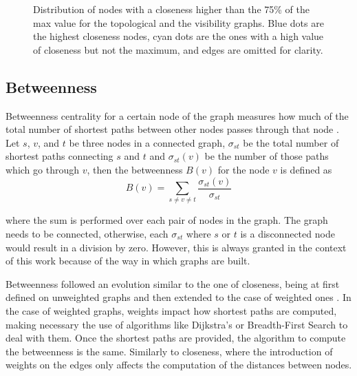 \begin{figure}


\caption{Distribution of nodes with a closeness higher than the 75\% of the
max value for the topological and the visibility graphs. Blue dots
are the highest closeness nodes, cyan dots are the ones with a high
value of closeness but not the maximum, and edges are omitted for
clarity.}

\end{figure}


\subsection{Betweenness}

Betweenness centrality for a certain node of the graph measures how
much of the total number of shortest paths between other nodes passes
through that node \cite{Freeman1978}. Let $s$, $v$, and
$t$ be three nodes in a connected graph, $\sigma_{st}$ be the total
number of shortest paths connecting $s$ and $t$ and $\sigma_{st}\left(v\right)$
be the number of those paths which go through $v$, then the betweenness
$B\left(v\right)$ for the node $v$ is defined as 
\[
B\left(v\right)=\sum_{s\neq v\neq t}\frac{\sigma_{st}\left(v\right)}{\sigma_{st}}
\]

where the sum is performed over each pair of nodes in the graph. The
graph needs to be connected, otherwise, each $\sigma_{st}$ where
$s$ or $t$ is a disconnected node would result in a division by
zero. However, this is always granted in the context of this work
because of the way in which graphs are built. 

Betweenness followed an evolution similar to the one of closeness,
being at first defined on unweighted graphs \cite{Freeman1978}
and then extended to the case of weighted ones \cite{Newman2001}.
In the case of weighted graphs, weights impact how shortest paths
are computed, making necessary the use of algorithms like Dijkstra's
or Breadth-First Search to deal with them. Once the shortest paths
are provided, the algorithm to compute the betweenness is the same.
Similarly to closeness, where the introduction of weights on the edges
only affects the computation of the distances between nodes. 

